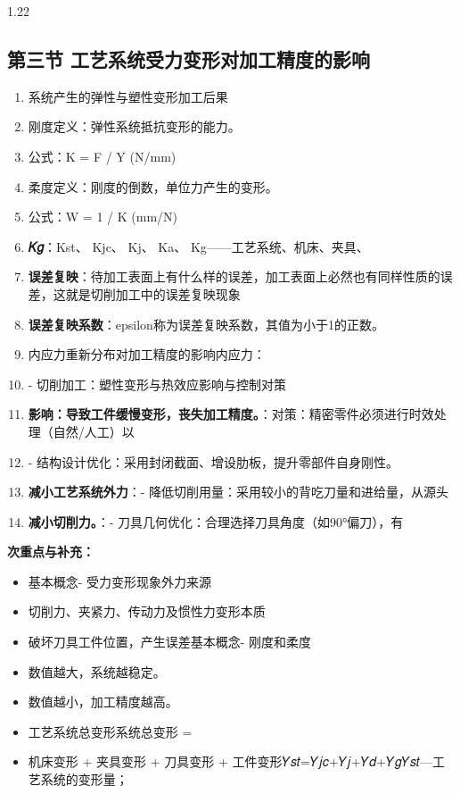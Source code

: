 \documentclass[12pt,a4paper]{article}
\begin{document}
\begin{spacing}{1.22}
\subsection{第三节 工艺系统受力变形对加工精度的影响}
\begin{tcolorbox}[colback=yellow!6,colframe=red!55!black,title=重点,left=1mm,right=1mm]
\begin{enumerate}[leftmargin=2.2em,label=\arabic*.]
  \item 系统产生的弹性与塑性变形加工后果
  \item 刚度定义：弹性系统抵抗变形的能力。
  \item 公式：K = F / Y (N/mm)
  \item 柔度定义：刚度的倒数，单位力产生的变形。
  \item 公式：W = 1 / K (mm/N)
  \item \textbf{𝐾𝑔}：Kst、 Kjc、 Kj、 Ka、 Kg——工艺系统、机床、夹具、
  \item \textbf{误差复映}：待加工表面上有什么样的误差，加工表面上必然也有同样性质的误差，这就是切削加工中的误差复映现象
  \item \textbf{误差复映系数}：epsilon称为误差复映系数，其值为小于1的正数。
  \item 内应力重新分布对加工精度的影响内应力：
  \item - 切削加工：塑性变形与热效应影响与控制对策
  \item \textbf{影响：导致工件缓慢变形，丧失加工精度。}：对策：精密零件必须进行时效处理（自然/人工）以
  \item - 结构设计优化：采用封闭截面、增设肋板，提升零部件自身刚性。
  \item \textbf{减小工艺系统外力}：- 降低切削用量：采用较小的背吃刀量和进给量，从源头
  \item \textbf{减小切削力。}：- 刀具几何优化：合理选择刀具角度（如90°偏刀），有
\end{enumerate}
\end{tcolorbox}
\noindent\textbf{次重点与补充：}
\begin{itemize}[leftmargin=2.2em,label=--]
  \item 基本概念- 受力变形现象外力来源
  \item 切削力、夹紧力、传动力及惯性力变形本质
  \item 破坏刀具工件位置，产生误差基本概念- 刚度和柔度
  \item 数值越大，系统越稳定。
  \item 数值越小，加工精度越高。
  \item 工艺系统总变形系统总变形 =
  \item 机床变形 + 夹具变形 + 刀具变形 + 工件变形𝑌𝑠𝑡=𝑌𝑗𝑐+𝑌𝑗+𝑌𝑑+𝑌𝑔𝑌𝑠𝑡—工艺系统的变形量；

\end{itemize}
\end{spacing}
\end{document}
